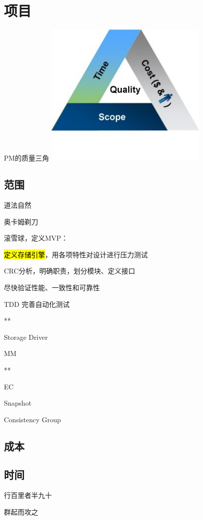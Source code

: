 \chapter{项目}

PM的质量三角
\includegraphics[width=8cm]{../imgs/quality.jpeg}

\section{范围}

道法自然

奥卡姆剃刀

滚雪球，定义MVP：
\begin{enumbox}
\item \hl{定义存储引擎}，用各项特性对设计进行压力测试
\item CRC分析，明确职责，划分模块、定义接口
\item 尽快验证性能、一致性和可靠性
\item TDD 完善自动化测试
\item ***
\item Storage Driver
\item MM
\item ***
\item EC
\item Snapshot
\item Consistency Group
\end{enumbox}

\section{成本}

\section{时间}

行百里者半九十

群起而攻之
